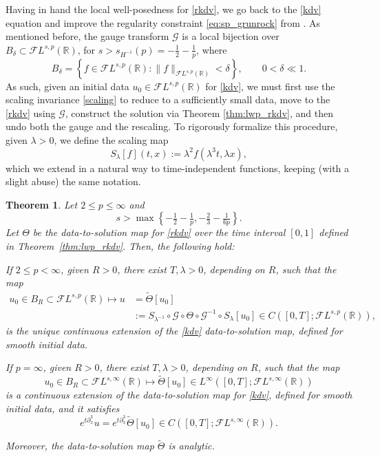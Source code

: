 \documentclass[a4paper,
11pt,  reqno]{amsart}
\newcommand{\5}{\textup{V}}
\newcommand{\noi}{\noindent}
\newcommand{\FL}{\mathcal{F} L}
\newcommand{\wt}{\widetilde}
\newcommand{\dx}{\partial_x}
\newtheorem{theorem}{Theorem} [section]
\theoremstyle{remark}
\newcommand{\R}{\mathbb{R}}
\newcommand{\ld}{\lambda}
\newcommand{\Gc}{\mathcal{G}}
\numberwithin{equation}{section}
\numberwithin{theorem}{section}
\begin{document}
Having in hand the local well-posedness for \eqref{rkdv}, we go back to the \eqref{kdv} equation and improve the regularity constraint \eqref{eq:sp_grunrock} from \cite{Grunrock_ldv_hier}. As mentioned before, the gauge transform $\Gc$ is a local bijection over $B_\delta\subset \FL^{s,p}(\R)$, for $s>s_{H^{-1}}(p) = -\frac12-\frac1p$, where
$$
B_\delta=\left\{ f \in \FL^{s,p}(\R): \|f\|_{\FL^{s,p}(\R)}<\delta\right\},\qquad 0<\delta\ll 1.
$$
As such, given an initial data $u_0\in \FL^{s,p}(\R)$ for \eqref{kdv}, we must first use the scaling invariance \eqref{scaling} to reduce to a sufficiently small data, move to the \eqref{rkdv} using $\Gc$, construct the solution via Theorem \ref{thm:lwp_rkdv}, and then undo both the gauge and the rescaling.
To rigorously formalize this procedure,  given $\lambda>0$, we define the scaling map
   \begin{equation}
    \label{SR}
    S_\lambda[f](t,x) := \lambda^2 f(\lambda^3 t, \lambda x), 
   \end{equation}
which we extend in a natural way to time-independent functions, keeping (with a slight abuse) the same notation.


\begin{theorem}\label{thm:wp_kdv_intro} Let $2\le p\le \infty$ and
\begin{equation}
\label{eq:reg-kdv}
s>\max\left\{-\tfrac12 - \tfrac1p, -\tfrac23-\tfrac1{6p}\right\}.
\end{equation}
Let $\Theta$ be the data-to-solution map for \eqref{rkdv} over the time interval $[0,1]$ defined in Theorem~\ref{thm:lwp_rkdv}. Then, the following hold:


\vspace{1mm}

\noi{\rm(i)} If $2 \le p<\infty$, given $R>0$, there exist $T, \ld>0$, depending on $R$, such that the map
\begin{align}
u_0\in B_R\subset\FL^{s,p}(\R)\mapsto u& 
=\wt\Theta[u_0] 
\\
&:= S_{\lambda^{-1}}\circ\mathcal{G}\circ\Theta  \circ \Gc^{-1}\circ S_\lambda[u_0]\in C([0,T];\FL^{s,p}(\R)),
\end{align}
is the unique continuous extension of the \eqref{kdv} data-to-solution map, defined for smooth initial data.


\smallskip

\noi{\rm(ii)} If $p=\infty$, given $R>0$, there exist $T, \ld>0$, depending on $R$, such that the map
\begin{equation}
u_0\in B_R\subset\FL^{s,\infty}(\R)\mapsto \wt\Theta[u_0]  \in L^\infty([0,T];\FL^{s,\infty}(\R))
\end{equation}
is a continuous extension of 
the data-to-solution map for \eqref{kdv}, defined for smooth initial data, and it satisfies
\begin{equation}
e^{t\dx^3} u = e^{t\dx^3} \wt\Theta[u_0] \in C([0,T] ; \FL^{s,\infty}(\R))
.
\end{equation}

\noi 
Moreover, the data-to-solution map $\wt{\Theta}$ is analytic.
	\end{theorem}
\end{document}
